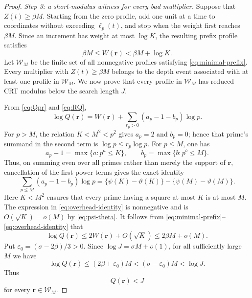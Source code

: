 \documentclass[11pt]{article}
\theoremstyle{remark}
\begin{document}
\begin{proof}
\medskip
\noindent\emph{Step 3: a short-modulus witness for every bad multiplier.}
Suppose that \(Z(t)\geq\beta M\).  Starting from the zero profile, add
one unit at a time to coordinates without exceeding
\(\ell_p(t)\), and stop when the weight first reaches \(\beta M\).
Since an increment has weight at most \(\log K\), the resulting prefix
profile satisfies
\begin{equation}\label{eq:minimal-prefix}
 \beta M\leq W(\mathbf r)<\beta M+\log K.
\end{equation}
Let \(\mathcal W_M\) be the finite set of all nonnegative profiles satisfying
\eqref{eq:minimal-prefix}.  Every multiplier with \(Z(t)\geq\beta M\)
belongs to the depth event associated with at least one profile in
\(\mathcal W_M\).  We now prove that every profile in \(\mathcal W_M\) has
reduced CRT modulus below the search length \(J\).

From \eqref{eq:Qpr} and \eqref{eq:RQ},
\begin{equation}\label{eq:logQ}
 \log Q(\mathbf r)
 =W(\mathbf r)+
  \sum_{r_p>0}(a_p-1-b_p)\log p.
\end{equation}
For \(p>M\), the relation \(K<M^2<p^2\) gives
\(a_p=2\) and \(b_p=0\); hence that prime's summand in the second term
is \(\log p\leq r_p\log p\).  For \(p\leq M\), one has
\[
 a_p-1=\max\{a:p^a\leq K\},
 \qquad
 b_p=\max\{b:p^b\leq M\}.
\]
Thus, on summing even over all primes rather than merely the support of
\(\mathbf r\), cancellation of the first-power terms gives the exact identity
\begin{equation}\label{eq:overhead-identity}
 \sum_{p\leq M}(a_p-1-b_p)\log p
 =\{\psi(K)-\vartheta(K)\}
  -\{\psi(M)-\vartheta(M)\}.
\end{equation}
Here \(K<M^2\) ensures that every prime having a square at most \(K\) is
at most \(M\).  The expression in \eqref{eq:overhead-identity} is
nonnegative and is \(O(\sqrt K)=o(M)\) by
\eqref{eq:psi-theta}.  It follows from
\eqref{eq:minimal-prefix}--\eqref{eq:overhead-identity} that
\begin{equation}\label{eq:Q-before-plus-one}
 \log Q(\mathbf r)
 \leq2W(\mathbf r)+O(\sqrt K)
 \leq2\beta M+o(M).
\end{equation}
Put \(\varepsilon_0=(\sigma-2\beta)/3>0\).  Since
\(\log J=\sigma M+o(1)\), for all sufficiently large \(M\) we have
\[
 \log Q(\mathbf r)
 \leq(2\beta+\varepsilon_0)M
 <(\sigma-\varepsilon_0)M
 <\log J.
\]
Thus
\begin{equation}\label{eq:Q-less-J}
 Q(\mathbf r)<J
\end{equation}
for every \(\mathbf r\in\mathcal W_M\).


\end{proof}
\end{document}
